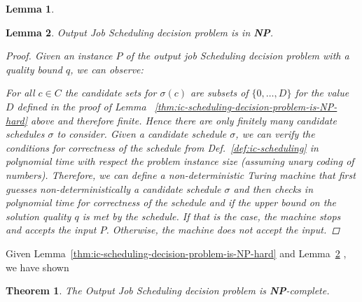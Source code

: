 \documentclass{article}
\newtheorem{mythm}{Theorem}
\newtheorem{mylemma}{Lemma}
\begin{document}
\begin{mylemma}

\end{mylemma}


\begin{mylemma}\label{thm:ic-scheduling-decision-in-NP} 
{\sc Output Job Scheduling} decision problem is in {\bf NP}.
\begin{proof}
Given an instance $P$ of the {\sc output job Scheduling} decision problem with a quality bound $q$, we can observe:

For all $c\in C$ the candidate sets for $\sigma(c)$ are subsets of $\{ 0, \ldots, D\}$ for the value $D$ defined in the proof of Lemma ~\ref{thm:ic-scheduling-decision-problem-is-NP-hard} above and therefore finite. Hence there are only finitely many candidate schedules $\sigma$ to consider. Given a candidate schedule $\sigma$, we can verify the conditions for correctness of the schedule from Def.~\ref{def:ic-scheduling} in polynomial time with respect the problem instance size (assuming unary coding of numbers). Therefore, we can define a non-deterministic Turing machine that first guesses non-deterministically a candidate schedule $\sigma$ and then checks in polynomial time for correctness of the schedule and if the upper bound on the solution quality $q$ is met by the schedule. If that is the case, the machine stops and accepts the input $P$. Otherwise, the machine does not accept the input.
\end{proof}
\end{mylemma}


Given Lemma~\ref{thm:ic-scheduling-decision-problem-is-NP-hard} and Lemma~\ref{thm:ic-scheduling-decision-in-NP} , we have shown 


\begin{mythm}
The {\sc Output Job Scheduling} decision problem is {\bf NP}-complete.
\end{mythm}
\end{document}
